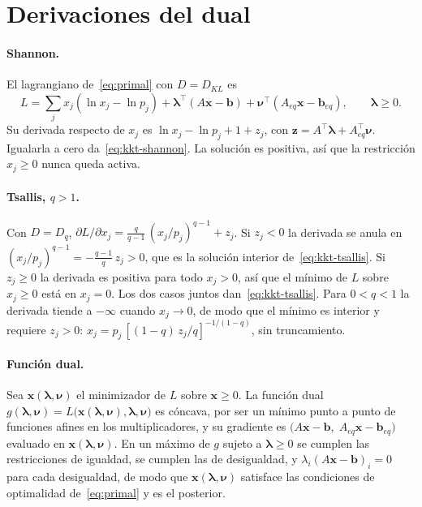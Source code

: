 \documentclass[11pt]{article}
\newcommand{\x}{\mathbf{x}}
\begin{document}
\appendix
\section{Derivaciones del dual}\label{app:dual}

\paragraph{Shannon.} El lagrangiano de~\eqref{eq:primal} con $D = D_{KL}$ es
\[
L = \sum_j x_j(\ln x_j - \ln p_j) + \boldsymbol{\lambda}^\top(A\x - \mathbf{b})
+ \boldsymbol{\nu}^\top(A_{eq}\x - \mathbf{b}_{eq}),
\qquad \boldsymbol{\lambda} \ge 0 .
\]
Su derivada respecto de $x_j$ es $\ln x_j - \ln p_j + 1 + z_j$, con
$\mathbf{z} = A^\top\boldsymbol{\lambda} + A_{eq}^\top\boldsymbol{\nu}$.
Igualarla a cero da~\eqref{eq:kkt-shannon}. La soluci\'on es positiva, as\'i
que la restricci\'on $x_j \ge 0$ nunca queda activa.

\paragraph{Tsallis, $q>1$.} Con $D = D_q$,
$\partial L/\partial x_j = \frac{q}{q-1}\,(x_j/p_j)^{q-1} + z_j$. Si
$z_j < 0$ la derivada se anula en
$(x_j/p_j)^{q-1} = -\frac{q-1}{q}\,z_j > 0$, que es la soluci\'on interior
de~\eqref{eq:kkt-tsallis}. Si $z_j \ge 0$ la derivada es positiva para todo
$x_j > 0$, as\'i que el m\'inimo de $L$ sobre $x_j \ge 0$ est\'a en $x_j = 0$.
Los dos casos juntos dan~\eqref{eq:kkt-tsallis}. Para $0<q<1$ la
derivada tiende a $-\infty$ cuando $x_j \to 0$, de modo que el m\'inimo es
interior y requiere $z_j > 0$:
$x_j = p_j\,[(1-q)\,z_j/q]^{-1/(1-q)}$, sin truncamiento.

\paragraph{Funci\'on dual.} Sea
$\x(\boldsymbol{\lambda},\boldsymbol{\nu})$ el minimizador de $L$ sobre
$\x \ge 0$. La funci\'on dual
$g(\boldsymbol{\lambda},\boldsymbol{\nu}) = L\big(\x(\boldsymbol{\lambda},\boldsymbol{\nu}),
\boldsymbol{\lambda},\boldsymbol{\nu}\big)$ es c\'oncava, por ser un m\'inimo punto a punto de
funciones afines en los multiplicadores, y su gradiente es
$\big(A\x - \mathbf{b},\; A_{eq}\x - \mathbf{b}_{eq}\big)$ evaluado en
$\x(\boldsymbol{\lambda},\boldsymbol{\nu})$. En un m\'aximo de $g$ sujeto a
$\boldsymbol{\lambda} \ge 0$ se cumplen las restricciones de igualdad, se
cumplen las de desigualdad, y $\lambda_i (A\x - \mathbf{b})_i = 0$ para cada
desigualdad, de modo que $\x(\boldsymbol{\lambda},\boldsymbol{\nu})$
satisface las condiciones de optimalidad de~\eqref{eq:primal} y es el
posterior.
\end{document}
